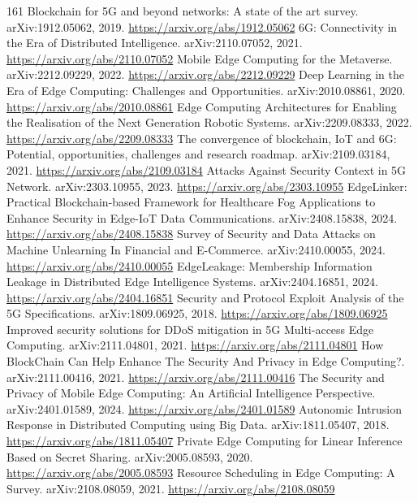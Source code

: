 \documentclass[11pt]{article}
\begin{document}
\begin{thebibliography}{161}
 Blockchain for 5G and beyond networks: A state of the art survey. arXiv:1912.05062, 2019. \url{https://arxiv.org/abs/1912.05062}
 6G: Connectivity in the Era of Distributed Intelligence. arXiv:2110.07052, 2021. \url{https://arxiv.org/abs/2110.07052}
 Mobile Edge Computing for the Metaverse. arXiv:2212.09229, 2022. \url{https://arxiv.org/abs/2212.09229}
 Deep Learning in the Era of Edge Computing: Challenges and Opportunities. arXiv:2010.08861, 2020. \url{https://arxiv.org/abs/2010.08861}
 Edge Computing Architectures for Enabling the Realisation of the Next Generation Robotic Systems. arXiv:2209.08333, 2022. \url{https://arxiv.org/abs/2209.08333}
 The convergence of blockchain, IoT and 6G: Potential, opportunities, challenges and research roadmap. arXiv:2109.03184, 2021. \url{https://arxiv.org/abs/2109.03184}
 Attacks Against Security Context in 5G Network. arXiv:2303.10955, 2023. \url{https://arxiv.org/abs/2303.10955}
 EdgeLinker: Practical Blockchain-based Framework for Healthcare Fog Applications to Enhance Security in Edge-IoT Data Communications. arXiv:2408.15838, 2024. \url{https://arxiv.org/abs/2408.15838}
 Survey of Security and Data Attacks on Machine Unlearning In Financial and E-Commerce. arXiv:2410.00055, 2024. \url{https://arxiv.org/abs/2410.00055}
 EdgeLeakage: Membership Information Leakage in Distributed Edge Intelligence Systems. arXiv:2404.16851, 2024. \url{https://arxiv.org/abs/2404.16851}
 Security and Protocol Exploit Analysis of the 5G Specifications. arXiv:1809.06925, 2018. \url{https://arxiv.org/abs/1809.06925}
 Improved security solutions for DDoS mitigation in 5G Multi-access Edge Computing. arXiv:2111.04801, 2021. \url{https://arxiv.org/abs/2111.04801}
 How BlockChain Can Help Enhance The Security And Privacy in Edge Computing?. arXiv:2111.00416, 2021. \url{https://arxiv.org/abs/2111.00416}
 The Security and Privacy of Mobile Edge Computing: An Artificial Intelligence Perspective. arXiv:2401.01589, 2024. \url{https://arxiv.org/abs/2401.01589}
 Autonomic Intrusion Response in Distributed Computing using Big Data. arXiv:1811.05407, 2018. \url{https://arxiv.org/abs/1811.05407}
 Private Edge Computing for Linear Inference Based on Secret Sharing. arXiv:2005.08593, 2020. \url{https://arxiv.org/abs/2005.08593}
 Resource Scheduling in Edge Computing: A Survey. arXiv:2108.08059, 2021. \url{https://arxiv.org/abs/2108.08059}

\end{thebibliography}
\end{document}
